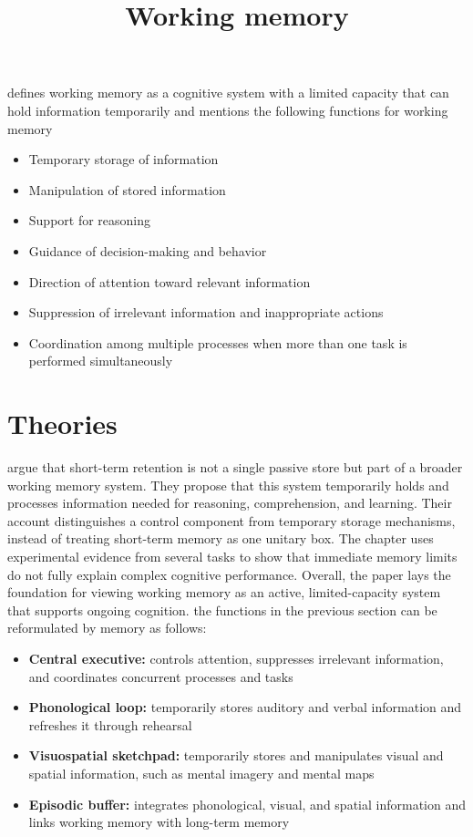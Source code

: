 \documentclass[a4paper]{article}
\title{Working memory}
\date{}
\begin{document}
    \maketitle
    
    
     defines working memory as a cognitive system with a limited capacity that can hold information temporarily
    and mentions the following functions for working memory
    \begin{itemize}
        \item Temporary storage of information
        \item Manipulation of stored information
        \item Support for reasoning
        \item Guidance of decision-making and behavior
        \item Direction of attention toward relevant information
        \item Suppression of irrelevant information and inappropriate actions
        \item Coordination among multiple processes when more than one task is performed simultaneously
    \end{itemize}
    
    
    \section{Theories}
        \cite{baddeley-1974-working-memory} argue that short-term retention is not a single passive store but part of a broader working memory system. They propose that this system temporarily holds and processes information needed for reasoning, comprehension, and learning. Their account distinguishes a control component from temporary storage mechanisms, instead of treating short-term memory as one unitary box. The chapter uses experimental evidence from several tasks to show that immediate memory limits do not fully explain complex cognitive performance. Overall, the paper lays the foundation for viewing working memory as an active, limited-capacity system that supports ongoing cognition.
        the functions in the previous section can be reformulated by \cite{baddeley-1974-working-memory} memory as follows:
        \begin{itemize}
            \item \textbf{Central executive:} controls attention, suppresses irrelevant information, and coordinates concurrent processes and tasks
            \item \textbf{Phonological loop:} temporarily stores auditory and verbal information and refreshes it through rehearsal
            \item \textbf{Visuospatial sketchpad:} temporarily stores and manipulates visual and spatial information, such as mental imagery and mental maps
            \item \textbf{Episodic buffer:} integrates phonological, visual, and spatial information and links working memory with long-term memory
        \end{itemize}
        
\end{document}
